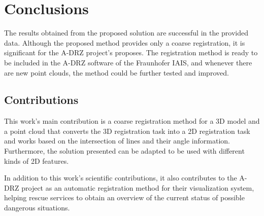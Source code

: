

    \chapter{Conclusions}

    The results obtained from the proposed solution are successful in the provided data.
    Although the proposed method provides only a coarse registration, it is significant for the A-DRZ project’s proposes. 
    The registration method is ready to be included in the A-DRZ software of the Fraunhofer IAIS, 
    and whenever there are new point clouds, the method could be further tested and improved.

    \section{Contributions}
        This work’s main contribution is a coarse registration method for a 3D model and a point cloud 
        that converts the 3D registration task into a 2D registration task and works based on the intersection of lines and their angle information. 
        Furthermore, the solution presented can be adapted to be used with different kinds of 2D features.
    
        In addition to this work’s scientific contributions, 
        it also contributes to the A-DRZ project as an automatic registration method for their visualization system, 
        helping rescue services to obtain an overview of the current status of possible dangerous situations.
    


